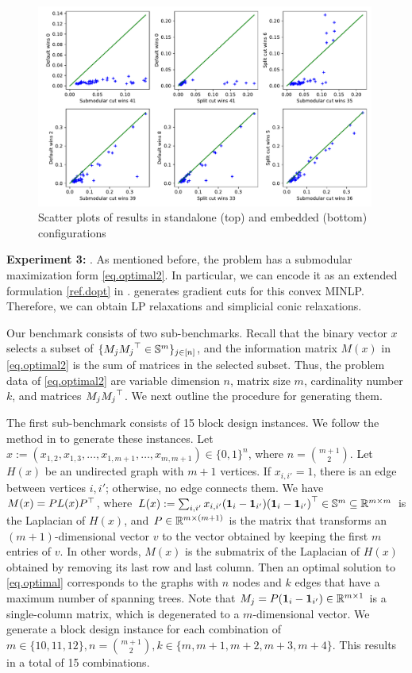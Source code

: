 \begin{figure}[h]
    \centering
    \includegraphics[width=0.99\textwidth]{Chaptersub/media/scatter_mubo.pdf}
    \caption{Scatter plots of \pbm results in standalone (top) and embedded (bottom) configurations}
    \label{fig:mubo}
\end{figure}

\textbf{Experiment 3:} \bdopt.
As mentioned before, the \bdopt problem has a submodular maximization form \eqref{eq.optimal2}. In particular, we can encode it as an extended formulation \eqref{ref.dopt} in \scip. \scip generates gradient cuts for this convex MINLP. Therefore, we can obtain LP relaxations and simplicial conic relaxations.

 Our benchmark consists of two sub-benchmarks.  Recall that the binary vector $x$ selects a subset of $\{M_j {M_j}^\top  \in {\mathbb S}^m\}_{j \in [n]}$, and the information matrix $M(x)$ in \eqref{eq.optimal2} is the sum of matrices in the selected subset. Thus, the problem data of \eqref{eq.optimal2} are variable dimension $n$, matrix size $m$, cardinality number $k$, and matrices $M_j {M_j}^\top$.  We next outline the procedure for generating them.
 
The first sub-benchmark consists of 15 block design  instances. We follow the method in \cite{sagnol2015computing} to generate these instances.  Let $x:=(x_{1,2},x_{1,3},\dots,x_{1,m+1},\dots,x_{m,m+1}) \in \{0,1\}^n$, where $n =\binom {m+1} 2$. Let  $H(x)$  be an undirected graph  with $m+1$ vertices. If $x_{i,i'} =1$, there is an edge between vertices $i,i'$; otherwise, no edge 
connects them. We have $M(x) = P L(x){P}^\top$, where $L(x) := \sum_{i,i'} x_{i,i'} (\mathbf{1}_i - \mathbf{1}_{i'} ){(\mathbf{1}_i - \mathbf{1}_{i'})} ^{\top} \in {\mathbb S}^m \subseteq \mathbb R^{m \times m}$ is
the Laplacian of $H(x)$, and $P \in \mathbb R^{m \times (m+1)}$ is the matrix
that transforms an $(m+1)$-dimensional vector $v$ to the vector obtained by keeping the first
$m$ entries of $v$.  In other words, $M(x)$ is the submatrix of the Laplacian of $H(x)$
obtained by removing its last row and last column. Then an optimal solution to \eqref{eq.optimal} corresponds to the graphs with $n$ nodes and $k$
edges that have a maximum number of spanning trees. Note that  $M_j =  P  (\mathbf{1}_i - \mathbf{1}_{i'} )\in \mathbb R^{m \times 1}$ is a single-column matrix, which  is degenerated to a $m$-dimensional vector.  We generate a block design instance for each combination of $m \in \{10, 11, 12\}, n =\binom {m+1} 2, k \in \{m, m+1, m+2, m+3, m+4\}$. This results in a total of 15 combinations.

